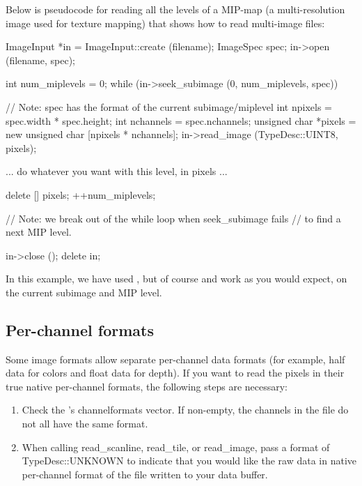 Below is pseudocode for reading all the levels of a MIP-map (a
multi-resolution image used for texture mapping) that shows how to read
multi-image files:

\begin{code}
        ImageInput *in = ImageInput::create (filename);
        ImageSpec spec;
        in->open (filename, spec);

        int num_miplevels = 0;
        while (in->seek_subimage (0, num_miplevels, spec)) {
            // Note: spec has the format of the current subimage/miplevel
            int npixels = spec.width * spec.height;
            int nchannels = spec.nchannels;
            unsigned char *pixels = new unsigned char [npixels * nchannels];
            in->read_image (TypeDesc::UINT8, pixels);

            ... do whatever you want with this level, in pixels ...

            delete [] pixels;
            ++num_miplevels;
        }
        // Note: we break out of the while loop when seek_subimage fails
        // to find a next MIP level.

        in->close ();
        delete in;
\end{code}

In this example, we have used \readimage, but of course \readscanline
and \readtile work as you would expect, on the current subimage and MIP
level.


\subsection{Per-channel formats}
\label{sec:imageinput:channelformats}

Some image formats allow separate per-channel data formats (for example,
{\cf half} data for colors and {\cf float} data for depth).  If you want
to read the pixels in their true native per-channel formats,
the following steps are necessary:

\begin{enumerate}
\item Check the \ImageSpec's {\cf channelformats} vector.  If non-empty,
  the channels in the file do not all have the same format.
\item When calling {\cf read_scanline}, {\cf read_tile}, or {\cf
  read_image}, pass a format of {\cf TypeDesc::UNKNOWN} to indicate that
  you would like the raw data in native per-channel format of the file
  written to your {\cf data} buffer.
\end{enumerate}

